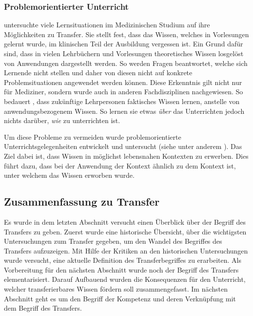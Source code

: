 \subsubsection{Problemorientierter Unterricht}

\citet{Williams1992} untersuchte viele Lernsituationen im Medizinischen Studium auf ihre Möglichkeiten zu Transfer. Sie stellt fest, dass das Wissen, welches in Vorlesungen gelernt wurde, im klinischen Teil der Ausbildung vergessen ist. Ein Grund dafür sind, dass in vielen Lehrbüchern und Vorlesungen theoretisches Wissen losgelöst von Anwendungen dargestellt werden. So werden Fragen beantwortet, welche sich Lernende nicht stellen und daher von diesen nicht auf konkrete Problemsituationen angewendet werden können.
Diese Erkenntnis gilt nicht nur für Mediziner, sondern wurde auch in anderen Fachdisziplinen nachgewiesen. So bedauert \citet{Shuell1996}, dass zukünftige Lehrpersonen faktisches Wissen lernen, anstelle von anwendungsbezogenem Wissen. So lernen sie etwas \textit{über} das Unterrichten jedoch nichts darüber, \textit{wie} zu unterrichten ist.

Um diese Probleme zu vermeiden wurde problemorientierte Unterrichtsgelegenheiten entwickelt und untersucht (siehe unter anderem \citet{Barrows1985,Michael1993,Shuell1996,Corte2003,Reusser2005,Fassler2007,Pea2013b}). Das Ziel dabei ist, dass Wissen in möglichst lebensnahen Kontexten zu erwerben. Dies führt dazu, dass bei der Anwendung der Kontext ähnlich zu dem Kontext ist, unter welchem das Wissen erworben wurde.

\subsection{Zusammenfassung zu Transfer}

Es wurde in dem letzten Abschnitt versucht einen Überblick über der Begriff des Transfers zu geben. Zuerst wurde eine historische Übersicht, über die wichtigsten Untersuchungen zum Transfer gegeben, um den Wandel des Begriffes des Transfers aufzuzeigen. Mit Hilfe der Kritiken an den historischen Untersuchungen wurde versucht, eine aktuelle Definition des Transferbegriffes zu erarbeiten. Als Vorbereitung für den nächsten Abschnitt wurde noch der Begriff des Transfers elementarisiert. Darauf Aufbauend wurden die Konsequenzen für den Unterricht, welcher transferierbares Wissen fördern soll zusammengefasst. Im nächsten Abschnitt geht es um den Begriff der Kompetenz und deren Verknüpfung mit dem Begriff des Transfers.


